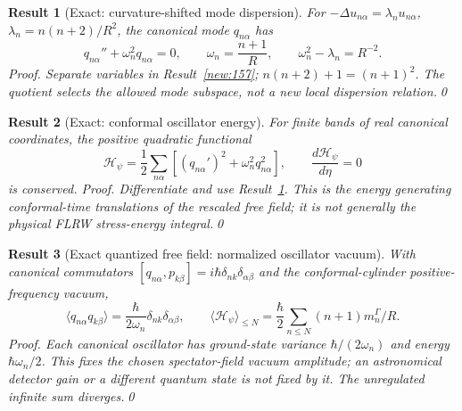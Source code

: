 \documentclass[aps,prd,onecolumn,notitlepage,groupedaddress,11pt]{revtex4-2}
\newtheorem{result}{Result}
\begin{document}
\begin{result}[\textsf{Exact}: curvature-shifted mode dispersion]\label{new:158}
For $-\Delta u_{n\alpha}=\lambda_nu_{n\alpha}$, $\lambda_n=n(n+2)/R^2$, the canonical mode $q_{n\alpha}$ has
\begin{equation}\label{new:eq158}
 q_{n\alpha}''+\omega_n^2q_{n\alpha}=0,\qquad \omega_n=\frac{n+1}{R},\qquad \omega_n^2-\lambda_n=R^{-2}.
\end{equation}
\textit{Proof.} Separate variables in Result~\ref{new:157}; $n(n+2)+1=(n+1)^2$. The quotient selects the allowed mode subspace, not a new local dispersion relation.\qed
\end{result}

\begin{result}[\textsf{Exact}: conformal oscillator energy]\label{new:159}
For finite bands of real canonical coordinates, the positive quadratic functional
\begin{equation}\label{new:eq159}
 \mathcal H_\psi=\frac12\sum_{n\alpha}[(q_{n\alpha}')^2+\omega_n^2q_{n\alpha}^2],\qquad \frac{d\mathcal H_\psi}{d\eta}=0
\end{equation}
is conserved. \textit{Proof.} Differentiate and use Result~\ref{new:158}. This is the energy generating conformal-time translations of the rescaled free field; it is not generally the physical FLRW stress-energy integral.\qed
\end{result}

\begin{result}[\textsf{Exact quantized free field}: normalized oscillator vacuum]\label{new:160}
With canonical commutators $[q_{n\alpha},p_{k\beta}]=i\hbar\delta_{nk}\delta_{\alpha\beta}$ and the conformal-cylinder positive-frequency vacuum,
\begin{equation}\label{new:eq160}
 \langle q_{n\alpha}q_{k\beta}\rangle=\frac{\hbar}{2\omega_n}\delta_{nk}\delta_{\alpha\beta},\qquad
 \langle \mathcal H_\psi\rangle_{\le N}=\frac{\hbar}{2}\sum_{n\le N}(n+1)m_n^\Gamma/R.
\end{equation}
\textit{Proof.} Each canonical oscillator has ground-state variance $\hbar/(2\omega_n)$ and energy $\hbar\omega_n/2$. This fixes the \emph{chosen spectator-field vacuum amplitude}; an astronomical detector gain or a different quantum state is not fixed by it. The unregulated infinite sum diverges.\qed
\end{result}
\end{document}
